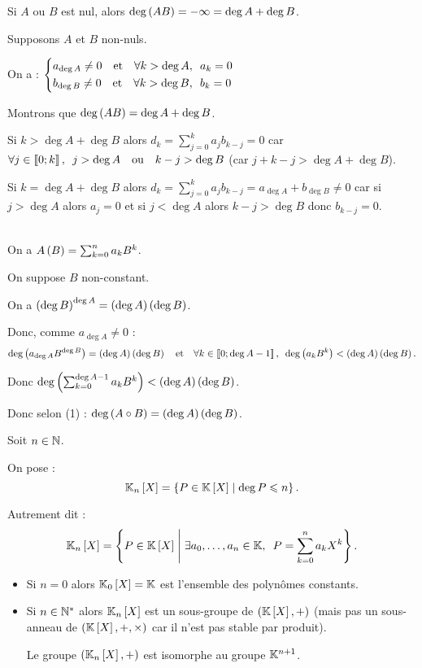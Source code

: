 \begin{dem}[2]
Si \(A\) ou \(B\) est nul, alors \(\deg\left(AB\right)=-\infty=\deg A+\deg B\).

Supposons \(A\) et \(B\) non-nuls.

On a : \(\begin{dcases}a_{\deg A}\not=0\quad\text{et}\quad\quantifs{\forall k>\deg A}a_k=0 \\ b_{\deg B}\not=0\quad\text{et}\quad\quantifs{\forall k>\deg B}b_k=0\end{dcases}\)

Montrons que \(\deg\left(AB\right)=\deg A+\deg B\).

Si \(k>\deg A+\deg B\) alors \(d_k=\sum_{j=0}^{k}a_jb_{k-j}=0\) car \(\quantifs{\forall j\in\interventierii{0}{k}}j>\deg A\quad\text{ou}\quad k-j>\deg B\) (car \(j+k-j>\deg A+\deg B\)).

Si \(k=\deg A+\deg B\) alors \(d_k=\sum_{j=0}^{k}a_jb_{k-j}=a_{\deg A}+b_{\deg B}\not=0\) car si \(j>\deg A\) alors \(a_j=0\) et si \(j<\deg A\) alors \(k-j>\deg B\) donc \(b_{k-j}=0\).
\end{dem}

\begin{dem}[3]~\\
On a \(A\left(B\right)=\sum_{k=0}^{n}a_kB^k\).

On suppose \(B\) non-constant.

On a \(\left(\deg B\right)^{\deg A}=\left(\deg A\right)\left(\deg B\right)\).

Donc, comme \(a_{\deg A}\not=0\) : \[\deg\paren{a_{\deg A}B^{\deg B}}=\paren{\deg A}\paren{\deg B}\quad\text{et}\quad\quantifs{\forall k\in\interventierii{0}{\deg A-1}}\deg\paren{a_kB^k}<\paren{\deg A}\paren{\deg B}.\]

Donc \(\deg\left(\sum_{k=0}^{\deg A-1}a_kB^k\right)<\left(\deg A\right)\left(\deg B\right)\).

Donc selon (1) : \(\deg\left(A\circ B\right)=\left(\deg A\right)\left(\deg B\right)\).
\end{dem}

\begin{nota}
Soit \(n\in\mathbb{N}\).

On pose : \[\poly[\K_n]=\accol{P\in\poly\tq\deg P\leq n}.\]

Autrement dit : \[\poly[\K_n]=\accol{P\in\poly\tq\quantifs{\exists a_0,\dots,a_n\in\K}P=\sum_{k=0}^{n}a_kX^k}.\]
\end{nota}

\begin{rem}
\begin{itemize}
\item Si \(n=0\) alors \(\poly[\K_0]=\K\) est l'ensemble des polynômes constants. \\

\item Si \(n\in\mathbb{N}^*\) alors \(\poly[\K_n]\) est un sous-groupe de \(\groupe{\poly}\) (mais pas un sous-anneau de \(\anneau{\poly}\) car il n'est pas stable par produit).

Le groupe \(\groupe{\poly[\K_n]}\) est isomorphe au groupe \(\mathbb{K}^{n+1}\). \\
\end{itemize}
\end{rem}

